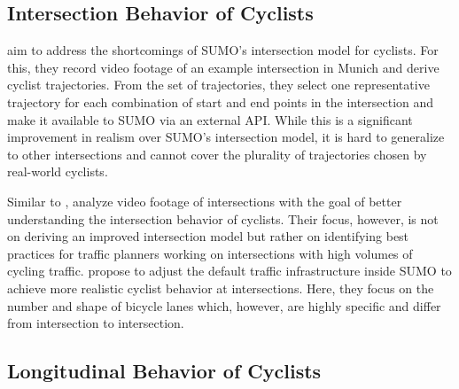 \subsection{Intersection Behavior of Cyclists}%
\label{subsec:rw_intersection}

\textcite{kaths2016integration} aim to address the shortcomings of SUMO's intersection model for cyclists.
For this, they record video footage of an example intersection in Munich and derive cyclist trajectories.
From the set of trajectories, they select one representative trajectory for each combination of start and end points in the intersection and make it available to SUMO via an external API.
While this is a significant improvement in realism over SUMO's intersection model, it is hard to generalize to other intersections and cannot cover the plurality of trajectories chosen by real-world cyclists.


Similar to \textcite{kaths2016integration}, \textcite{grigoropoulos2022traffic} analyze video footage of intersections with the goal of better understanding the intersection behavior of cyclists.
Their focus, however, is not on deriving an improved intersection model but rather on identifying best practices for traffic planners working on intersections with high volumes of cycling traffic.
\textcite{grigoropoulos2019modelling} propose to adjust the default traffic infrastructure inside SUMO to achieve more realistic cyclist behavior at intersections.
Here, they focus on the number and shape of bicycle lanes which, however, are highly specific and differ from intersection to intersection.

\subsection{Longitudinal Behavior of Cyclists}%
\label{subsec:rw_longitudinal}

